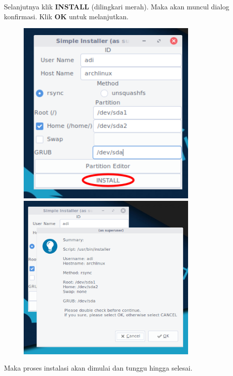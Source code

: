 \documentclass[12pt,]{article}
\begin{document}
	Selanjutnya klik \textbf{INSTALL} (dilingkari merah).
	Maka akan muncul dialog konfirmasi.
	Klik \textbf{OK} untuk melanjutkan.
	
	\newpage
	\begin{figure}[!ht]
		\centering
		\includegraphics[width=250pt]{installhdd/step_17}
		\includegraphics[width=250pt]{installhdd/step_18}
	\end{figure}

	Maka proses instalasi akan dimulai dan tunggu hingga selesai.
	
\end{document}
